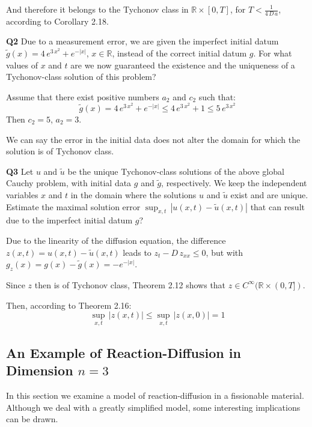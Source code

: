 \documentclass[../main.tex]{subfiles}
\begin{document}
And therefore it belongs to the Tychonov class in $\mathbb{R} \times [0,T]$, for $T < \frac{1}{4 \, D \, a}$, according to Corollary 2.18.

\textbf{Q2}  Due to a measurement error, we are given the imperfect initial datum $\tilde{g}(x) = 4 \, e^{3 \, x^2} + e^{−|x|}$, $x \in \mathbb{R}$, instead of the correct initial datum $g$. For what values of $x$ and $t$ are we now guaranteed the existence and the uniqueness of a Tychonov-class solution of this problem?

Assume that there exist positive numbers $a_2$ and $c_2$ such that:
\begin{equation}
    \tilde{g}(x) = 4 \, e^{3 \, x^2} + e^{−|x|} \leqslant 4 \, e^{3 \, x^2} + 1 \leqslant 5 \, e^{3 \, x^2}
\end{equation}
Then $c_2 = 5$, $a_2 = 3$.

We can say the error in the initial data does not alter the domain for which the solution is of Tychonov class.

\textbf{Q3}  Let $u$ and $\tilde{u}$ be the unique Tychonov-class solutions of the above global Cauchy problem, with initial data $g$ and $\tilde{g}$, respectively. We keep the independent variables $x$ and $t$ in the domain where the solutions $u$ and $\tilde{u}$ exist and are unique. Estimate the maximal solution error $\sup_{x,t} \, |u(x,t) - \tilde{u}(x,t)|$ that can result due to the imperfect initial datum $g$?

Due to the linearity of the diffusion equation, the difference $z(x,t) = u(x,t) - \tilde{u}(x, t)$ leads to $z_t - D \, z_{xx} \leqslant 0$, but with $g_z(x) = g(x) - \tilde{g}(x) = - e^{-|x|}$. 

Since $z$ then is of Tychonov class, Theorem 2.12 shows that $z \in C^{\infty}(\mathbb{R} \times (0,T])$.

Then, according to Theorem 2.16:
\begin{equation}
    \sup_{x,t} \, |z(x,t)| \leqslant \sup_{x,t} \, |z(x,0)| = 1
\end{equation}

\subsection{An Example of Reaction-Diffusion in Dimension $n = 3$}

In this section we examine a model of reaction-diffusion in a fissionable material. Although we deal with a greatly simplified model, some interesting implications can be drawn.
\end{document}
